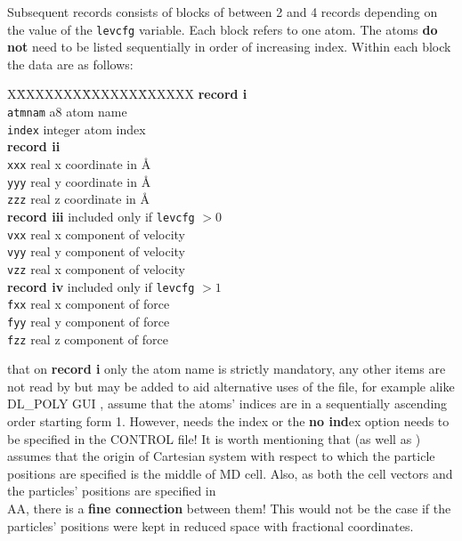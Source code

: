 Subsequent records consists of blocks of between 2 and 4 records
depending on the value of the {\tt levcfg} variable.  Each block
refers to one atom.  The atoms {\bf do not} need to be listed
sequentially in order of increasing index.  Within each block the
data are as follows:
\begin{tabbing}
X\=XXXXXXX\=XXXXXX\=XXXXXX\kill
{\bf record i} \\
\> {\tt atmnam}  \> a8      \> atom name \\
\> {\tt index}   \> integer \> atom index \\
{\bf record ii} \\
\> {\tt xxx}     \> real    \> x coordinate in \AA \\
\> {\tt yyy}     \> real    \> y coordinate in \AA \\
\> {\tt zzz}     \> real    \> z coordinate in \AA \\
{\bf record iii} \>         \> included only if {\tt levcfg} $>0$ \\
\> {\tt vxx}     \> real    \> x component of velocity \\
\> {\tt vyy}     \> real    \> y component of velocity \\
\> {\tt vzz}     \> real    \> x component of velocity \\
{\bf record iv}  \>         \> included only if {\tt levcfg} $>1$ \\
\> {\tt fxx}     \> real    \> x component of force \\
\> {\tt fyy}     \> real    \> y component of force \\
\> {\tt fzz}     \> real    \> z component of force
\end{tabbing}
 that on {\bf record i} only the atom name is
strictly mandatory, any other items are not read by \C but may be
added to aid alternative uses of the file, for example alike DL\_POLY
GUI \cite{smith-gui}, \C assume that the atoms' indices
are in a sequentially ascending order starting form 1.  However, \D
needs the index or the {\bf no ind}ex option needs to be specified in
the CONTROL file!  It is worth mentioning that \D (as well as \C)
assumes that the origin of Cartesian system with respect to which
the particle positions are specified is the middle of MD cell.  Also,
as both the cell vectors and the particles' positions are specified
in \\AA, there is a {\bf fine connection} between them!  This would
not be the case if the particles' positions were kept in reduced space
with fractional coordinates.

